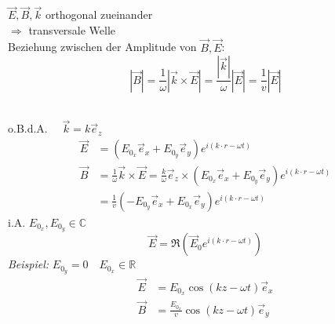 \begin{minipage}{.5\linewidth}
	$ \vec{E}, \vec{B}, \vec{k} $ orthogonal zueinander\\
	$ \Rightarrow $ transversale Welle\\
	Beziehung zwischen der Amplitude von $ \vec{B}, \vec{E} $:
	\begin{equation*}
	|\vec{B}| = \frac{1}{\omega} |\vec{k} \times \vec{E}| = \frac{|\vec{k}|}{\omega} |\vec{E}| = \frac{1}{v} |\vec{E}|
	\end{equation*}
\end{minipage}%
\begin{minipage}{.5\linewidth}
	\flushright
\end{minipage}%
\\
o.B.d.A. $ \quad \vec{k} = k \vec{e}_z $
\begin{align*}
\vec{E} &= (E_{0_x} \vec{e}_x + E_{0_y} \vec{e}_y) e^{i(k \cdot r - \omega t)} \\
\vec{B} &= \frac{1}{\omega} \vec{k} \times \vec{E} = \frac{k}{\omega} \vec{e}_z \times (E_{0_x} \vec{e}_x + E_{0_y} \vec{e}_y) e^{i(k \cdot r - \omega t)} \\
&= \frac{1}{v} (- E_{0_y} \vec{e}_x + E_{0_x} \vec{e}_y) e^{i(k \cdot r - \omega t)} 
\end{align*}
i.A. $ E_{0_x}, E_{0_y} \in \mathbb{C} $
\begin{equation*}
\vec{E} = \Re\left(\vec{E}_0 e^{i(k \cdot r - \omega t)} \right)
\end{equation*}
\emph{Beispiel:} $ E_{0_y} = 0 \quad E_{0_x} \in \mathbb{R} $
\begin{align}
\vec{E} &= E_{0_x} \cos (kz - \omega t) \vec{e}_x \\
\vec{B} &= \frac{E_{0_x}}{v} \cos(kz - \omega t) \vec{e}_y
\end{align}

